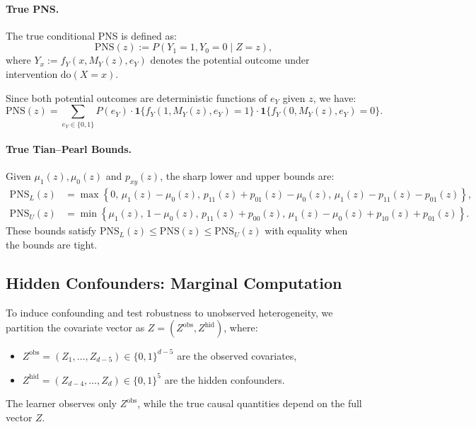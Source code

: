 \documentclass[accepted]{uai2026} %
\theoremstyle{plain}
\theoremstyle{definition}
\theoremstyle{remark}
\begin{document}
\paragraph{True PNS.}
The true conditional PNS is defined as:
\begin{equation}
\text{PNS}(z) := P(Y_1 = 1, Y_0 = 0 \mid Z = z),
\end{equation}
where $Y_x := f_Y(x, M_Y(z), e_Y)$ denotes the potential outcome under intervention $\text{do}(X = x)$.

Since both potential outcomes are deterministic functions of $e_Y$ given $z$, we have:
\begin{equation}
\text{PNS}(z) = \sum_{e_Y \in \{0,1\}} P(e_Y) \cdot \mathbf{1}\{f_Y(1, M_Y(z), e_Y) = 1\} \cdot \mathbf{1}\{f_Y(0, M_Y(z), e_Y) = 0\}.
\end{equation}

\paragraph{True Tian--Pearl Bounds.}
Given $\mu_1(z), \mu_0(z)$ and $p_{xy}(z)$, the sharp lower and upper bounds are:
\begin{align}
\text{PNS}_L(z) &= \max\left\{0,\, \mu_1(z) - \mu_0(z),\, p_{11}(z) + p_{01}(z) - \mu_0(z),\, \mu_1(z) - p_{11}(z) - p_{01}(z)\right\}, \\
\text{PNS}_U(z) &= \min\left\{\mu_1(z),\, 1 - \mu_0(z),\, p_{11}(z) + p_{00}(z),\, \mu_1(z) - \mu_0(z) + p_{10}(z) + p_{01}(z)\right\}.
\end{align}
These bounds satisfy $\text{PNS}_L(z) \leq \text{PNS}(z) \leq \text{PNS}_U(z)$ with equality when the bounds are tight.


\subsection{Hidden Confounders: Marginal Computation}
\label{app:dgp:marginal}

To induce confounding and test robustness to unobserved heterogeneity, we partition the covariate vector as $Z = (Z^{\text{obs}}, Z^{\text{hid}})$, where:
\begin{itemize}
    \item $Z^{\text{obs}} = (Z_1, \ldots, Z_{d-5}) \in \{0,1\}^{d-5}$ are the observed covariates,
    \item $Z^{\text{hid}} = (Z_{d-4}, \ldots, Z_d) \in \{0,1\}^5$ are the hidden confounders.
\end{itemize}
The learner observes only $Z^{\text{obs}}$, while the true causal quantities depend on the full vector $Z$.
\end{document}
